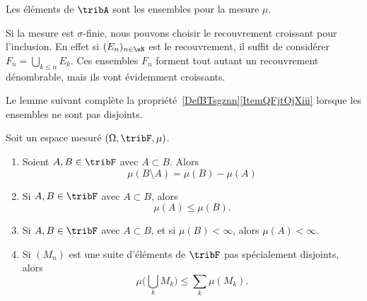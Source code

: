 \begin{definition}\label{DefHGsQxHB}
	Les éléments de \( \tribA\) sont les ensembles  pour la mesure \( \mu\).
\end{definition}

Si la mesure est \( \sigma\)-finie, nous pouvons choisir le recouvrement croissant pour l'inclusion. En effet si \( (E_n)_{n\in \eN}\) est le recouvrement, il suffit de considérer \( F_n=\bigcup_{k\leq n}E_k\). Ces ensembles \( F_n\) forment tout autant un recouvrement dénombrable, mais ils vont évidemment croissants.

Le lemme suivant complète la propriété~\ref{DefBTsgznn}\ref{ItemQFjtOjXiii} lorsque les ensembles ne sont pas disjoints.
\begin{lemma} \label{LemPMprYuC}
	Soit un espace mesuré \( (\Omega,\tribF,\mu)\).
	\begin{enumerate}
		\item       \label{ITEMooSUIRooNDVOoB}
		      Soient \( A,B\in\tribF\) avec \( A\subset B\). Alors
		      \begin{equation}
			      \mu(B\setminus A)=\mu(B)-\mu(A)
		      \end{equation}
		\item       \label{ITEMooLEGKooWnYmlf}
		      Si \( A,B\in \tribF\) avec \( A\subset B\), alors
		      \begin{equation}
			      \mu(A)\leq \mu(B).
		      \end{equation}
		\item       \label{ITEMooMCNBooRGVGqA}
		      Si \( A,B\in \tribF\) avec \( A\subset B\), et si \( \mu(B)<\infty\), alors \( \mu(A)<\infty\).
		\item       \label{ITEMooABPYooFQEzqE}
		      Si \( (M_n)\) est une suite d'éléments de \( \tribF\) pas spécialement disjoints, alors
		      \begin{equation}\label{EqWWFooYPCTt}
			      \mu\big( \bigcup_kM_k \big)\leq \sum_{k}\mu(M_k).
		      \end{equation}
	\end{enumerate}
\end{lemma}

